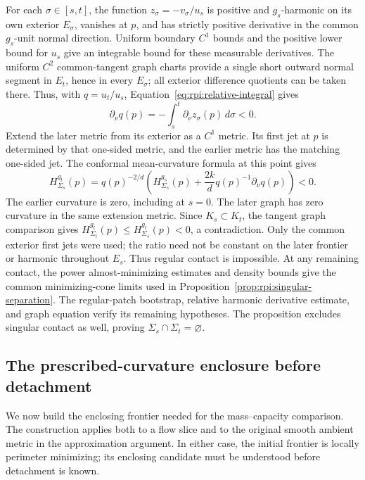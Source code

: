 For each $\sigma\in[s,t]$, the function
$z_\sigma=-v_\sigma/u_s$ is positive and $g_s$-harmonic on its
own exterior $E_\sigma$, vanishes at $p$, and has strictly positive
derivative in the common $g_s$-unit normal direction. Uniform
boundary $C^1$ bounds and the positive lower bound for $u_s$ give
an integrable bound for these measurable derivatives. The uniform
$C^2$ common-tangent graph charts provide a single short outward
normal segment in $E_t$, hence in every $E_\sigma$; all exterior
difference quotients can be taken there. Thus, with $q=u_t/u_s$,
Equation~\eqref{eq:rpi:relative-integral} gives
\[
 \partial_\nu q(p)
       =-\int_s^t\partial_\nu z_\sigma(p)\,d\sigma<0.
\]
Extend the later metric from its exterior as a $C^1$ metric. Its
first jet at $p$ is determined by that one-sided metric, and the
earlier metric has the matching one-sided jet. The conformal
mean-curvature formula at this point gives
\[
 H_{\Sigma_s}^{g_t}(p)
 =q(p)^{-2/d}\left(H_{\Sigma_s}^{g_s}(p)
                +\frac{2k}{d}q(p)^{-1}\partial_\nu q(p)\right)<0.
\]
The earlier curvature is zero, including at $s=0$. The later graph
has zero curvature in the same extension metric. Since $K_s\subset K_t$,
the tangent graph comparison gives
$H_{\Sigma_t}^{g_t}(p)\le H_{\Sigma_s}^{g_t}(p)<0$, a contradiction.
Only the common exterior first jets were used; the ratio need not be
constant on the later frontier or harmonic throughout $E_s$.
Thus regular contact is impossible. At any remaining contact, the
power almost-minimizing estimates and density bounds give the common
minimizing-cone limits used in
Proposition~\ref{prop:rpi:singular-separation}. The regular-patch
bootstrap, relative harmonic derivative estimate, and graph equation
verify its remaining hypotheses. The proposition excludes singular
contact as well, proving $\Sigma_s\cap\Sigma_t=\varnothing$.

\subsection{The prescribed-curvature enclosure before detachment}
\label{sec:rpi:perturbed-candidate}

We now build the enclosing frontier needed for the mass--capacity
comparison. The construction applies both to a flow slice and to the
original smooth ambient metric in the approximation argument. In
either case, the initial frontier is locally perimeter minimizing;
its enclosing candidate must be understood before detachment is known.

